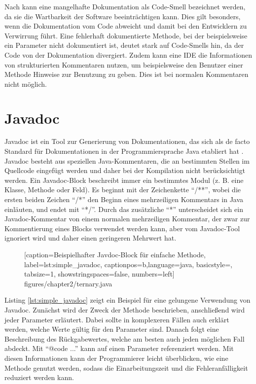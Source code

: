 Nach \cite[S. 249-250]{JavadocViolationsandTheirEvolutioninOpen-SourceSoftware} kann eine mangelhafte Dokumentation als Code-Smell bezeichnet werden, da sie die Wartbarkeit der Software beeinträchtigen kann. Dies gilt besonders, wenn die Dokumentation vom Code abweicht und damit bei den Entwicklern zu Verwirrung führt. Eine fehlerhaft dokumentierte Methode, bei der beispielsweise ein Parameter nicht dokumentiert ist, deutet stark auf Code-Smells hin, da der Code von der Dokumentation divergiert. Zudem kann eine \ac{IDE} die Informationen von strukturierten Kommentaren nutzen, um beispielsweise den Benutzer einer Methode Hinweise zur Benutzung zu geben. Dies ist bei normalen Kommentaren nicht möglich. 

\section{Javadoc}\label{chapter:javadoc}
Javadoc \cite{HowtoWriteDocCommentsfortheJavadocTool} ist ein Tool zur Generierung von Dokumentationen, das sich als de facto Standard für Dokumentationen in der Programmiersprache Java etabliert hat \cite[S. 249]{JavadocViolationsandTheirEvolutioninOpen-SourceSoftware}.  Javadoc besteht aus speziellen Java-Kommentaren, die an bestimmten Stellen im Quellcode eingefügt werden und daher bei der Kompilation nicht berücksichtigt werden. Ein Javadoc-Block beschreibt immer ein bestimmtes Modul (z. B. eine Klasse, Methode oder Feld). Es beginnt mit der Zeichenkette \enquote{/**}, wobei die ersten beiden Zeichen \enquote{/*} den Beginn eines mehrzeiligen Kommentars in Java einläuten, und endet mit \enquote{*/}. Durch das zusätzliche \enquote{*} unterscheidet sich ein Javadoc-Kommentar von einem normalen mehrzeiligen Kommentar, der zwar zur Kommentierung eines Blocks verwendet werden kann, aber vom Javadoc-Tool ignoriert wird und daher einen geringeren Mehrwert hat. 


		\begin{figure}[ht!]
			
			[caption={Beispielhafter Javdoc-Block für einfache Methode},
			label={lst:simple_javadoc},
			captionpos=b,language=java, basicstyle=\footnotesize, tabsize=1, showstringspaces=false,  numbers=left]
			{figures/chapter2/ternary.java}
		\end{figure}

Listing \ref{lst:simple_javadoc} zeigt ein Beispiel für eine gelungene Verwendung von Javadoc. Zunächst wird der Zweck der Methode beschrieben, anschließend wird jeder Parameter erläutert. Dabei sollte in komplexeren Fällen auch erklärt werden, welche Werte gültig für den Parameter sind. Danach folgt eine Beschreibung des Rückgabewertes, welche am besten auch jeden möglichen Fall abdeckt. Mit \enquote{{@code ...}} kann auf einen Parameter referenziert werden. Mit diesen Informationen kann der Programmierer leicht überblicken, wie eine Methode genutzt werden, sodass die Einarbeitungszeit und die Fehleranfälligkeit reduziert werden kann.  

